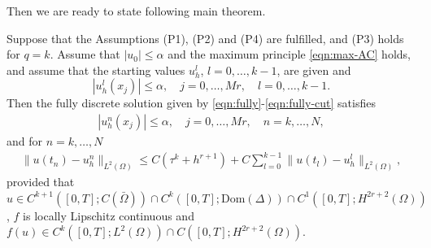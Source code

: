 \documentclass[10pt,final,leqno,onefignum,onetabnum]{siamltex}%
\def\II{(\Omega)}
\begin{document}
Then we are ready to state following main theorem.

\begin{theorem}\label{thm:fully-error}
Suppose that the Assumptions (P1), (P2) and (P4) are fulfilled, and (P3) holds for $q=k$.
Assume that $|u_0|\le \alpha$ and the maximum principle \eqref{eqn:max-AC} holds,
 and assume that the starting values $u_h^l$, $l=0,\dots,k-1$, are given and
$$
|u_h^l(x_j)|\le \alpha , \quad j=0,\dots,Mr,\quad l=0,\dots,k-1.
$$
Then the   {fully discrete} solution given by \eqref{eqn:fully}-\eqref{eqn:fully-cut} satisfies
\begin{align*}%
|u_h^n(x_j)|\le \alpha , \quad j=0,\dots,Mr,\quad n=k,\dots,N,
\end{align*}
and  {for $n=k,\ldots,N$}
\begin{align*}%
  \| u(t_n) - u_h^n \|_{L^2(\Omega)} \le  C(\tau^k + h^{r+1}) + C\sum_{l=0}^{k-1}\| u(t_l) - u_h^l \|_{L^2(\Omega)} ,
\end{align*}
provided that {$u\in C^{k+1}([0,T];C(\bar \Omega)) \cap C^{k}([0,T];\text{Dom}(\Delta)) \cap C^1([0,T];H^{2r+2}(\Omega))$, $f$ is locally Lipschitz continuous and $f(u)\in C^k([0,T];L^2\II)\cap C([0,T];H^{2r+2}\II)$.}
\end{theorem}
\end{document}

